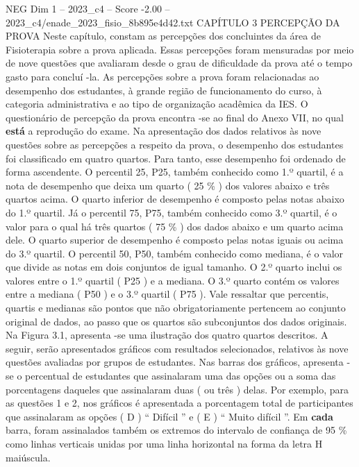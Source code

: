 \begin{textsample}{NEG Dim 1 – 2023\_c4 – Score -2.00 – 2023\_c4/enade\_2023\_fisio\_8b895e4d42.txt}  \label{ex:f1_neg_249}
CAPÍTULO 3 PERCEPÇÃO DA PROVA Neste capítulo, constam as percepções dos concluintes da área de Fisioterapia sobre a prova aplicada.
Essas percepções foram mensuradas por meio de nove questões que avaliaram desde o grau de dificuldade da prova até o tempo gasto para concluí -la.
As percepções sobre a prova foram relacionadas ao desempenho dos estudantes, à grande região de funcionamento do curso, à categoria administrativa e ao tipo de organização acadêmica da IES.
O questionário de percepção da prova encontra -se ao final do Anexo VII, no qual \textbf{está} a reprodução do exame.
Na apresentação dos dados relativos às nove questões sobre as percepções a respeito da prova, o desempenho dos estudantes foi classificado em quatro quartos.
Para tanto, esse desempenho foi ordenado de forma ascendente.
O percentil 25, P25, também conhecido como 1.º quartil, é a nota de desempenho que deixa um quarto ( 25 \% ) dos valores abaixo e três quartos acima.
O quarto inferior de desempenho é composto pelas notas abaixo do 1.º quartil.
Já o percentil 75, P75, também conhecido como 3.º quartil, é o valor para o qual há três quartos ( 75 \% ) dos dados abaixo e um quarto acima dele.
O quarto superior de desempenho é composto pelas notas iguais ou acima do 3.º quartil.
O percentil 50, P50, também conhecido como mediana, é o valor que divide as notas em dois conjuntos de igual tamanho.
O 2.º quarto inclui os valores entre o 1.º quartil ( P25 ) e a mediana.
O 3.º quarto contém os valores entre a mediana ( P50 ) e o 3.º quartil ( P75 ).
Vale ressaltar que percentis, quartis e medianas são pontos que não obrigatoriamente pertencem ao conjunto original de dados, ao passo que os quartos são subconjuntos dos dados originais.
Na Figura 3.1, apresenta -se uma ilustração dos quatro quartos descritos.
A seguir, serão apresentados gráficos com resultados selecionados, relativos às nove questões avaliadas por grupos de estudantes.
Nas barras dos gráficos, apresenta -se o percentual de estudantes que assinalaram uma das opções ou a soma das porcentagens daqueles que assinalaram duas ( ou três ) delas.
Por exemplo, para as questões 1 e 2, nos gráficos é apresentada a porcentagem total de participantes que assinalaram as opções ( D ) “ Difícil ” e ( E ) “ Muito difícil ”.
Em \textbf{cada} barra, foram assinalados também os extremos do intervalo de confiança de 95 \% como linhas verticais unidas por uma linha horizontal na forma da letra H maiúscula.

\end{textsample}
